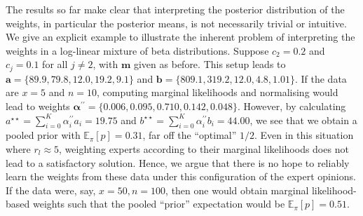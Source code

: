 \documentclass[a4paper, notitlepage, 11pt]{article}
\begin{document}
The results so far make clear that interpreting the posterior distribution of the weights, in particular the posterior means, is not necessarily trivial or intuitive.
We give an explicit example to illustrate the inherent problem of interpreting the weights in a log-linear mixture of beta distributions.
Suppose $c_2 = 0.2$ and $c_j = 0.1$ for all $j \neq 2$, with $\boldsymbol{m}$ given as before.
This setup leads to $\boldsymbol a = \{ 89.9, 79.8, 12.0, 19.2, 9.1\}$ and $\boldsymbol b = \{809.1, 319.2, 12.0, 4.8, 1.01\} $.
If the data are $x = 5$ and $n = 10$, computing marginal likelihoods and normalising would lead to weights $\boldsymbol\alpha^{\prime\prime} = \{0.006, 0.095, 0.710, 0.142, 0.048\}$.
However, by calculating $a^{\star\star} = \sum_{i = 0}^K \alpha_i^{\prime\prime} a_i = 19.75$ and $b^{\star\star} =  \sum_{i = 0}^K \alpha_i^{\prime\prime} b_i = 44.00$, we see that we obtain a pooled prior with $\mathbb{E}_\pi [p] =  0.31$, far off the ``optimal'' $1/2$.
Even in this situation where $r_l \approx 5$, weighting experts according to their marginal likelihoods does not lead to a satisfactory solution.
Hence, we argue that there is no hope to reliably learn the weights from these data under this configuration of the expert opinions.
If the data were, say, $x = 50, n = 100$, then one would obtain marginal likelihood-based weights such that the pooled ``prior'' expectation would be $\mathbb{E}_\pi [p] = 0.51$.
\end{document}
